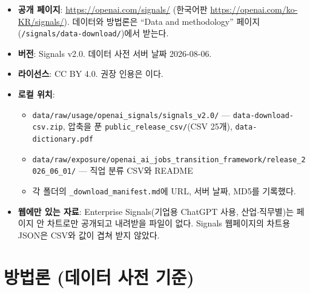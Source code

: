\documentclass[11pt]{article}
\begin{document}
\begin{itemize}
  \item \textbf{공개 페이지}: \url{https://openai.com/signals/} (한국어판 \url{https://openai.com/ko-KR/signals/}). 데이터와 방법론은 ``Data and methodology'' 페이지(\texttt{/signals/data-download/})에서 받는다.
  \item \textbf{버전}: Signals v2.0. 데이터 사전 서버 날짜 2026-08-06.
  \item \textbf{라이선스}: CC BY 4.0. 권장 인용은 \textcite{openai-2026-signals-v2}이다.
  \item \textbf{로컬 위치}:
  \begin{itemize}
    \item \texttt{data/raw/usage/openai\_signals/signals\_v2.0/} --- \texttt{data-download-csv.zip}, 압축을 푼 \texttt{public\_release\_csv/}(CSV 25개), \texttt{data-dictionary.pdf}
    \item \texttt{data/raw/exposure/openai\_ai\_jobs\_transition\_framework/release\_2026\_06\_01/} --- 직업 분류 CSV와 README
    \item 각 폴더의 \texttt{\_download\_manifest.md}에 URL, 서버 날짜, MD5를 기록했다.
  \end{itemize}
  \item \textbf{웹에만 있는 자료}: Enterprise Signals(기업용 ChatGPT 사용, 산업$\cdot$직무별)는 페이지 안 차트로만 공개되고 내려받을 파일이 없다. Signals 웹페이지의 차트용 JSON은 CSV와 값이 겹쳐 받지 않았다.
\end{itemize}

\section{방법론 (데이터 사전 기준)}
\end{document}
